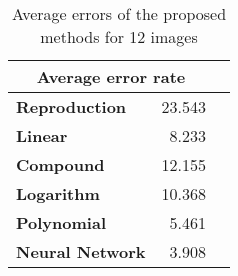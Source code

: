 \begin{table}[H]
  \begin{center}
  \resizebox{5cm}{!} {
    \begin{tabular}{l r r}
    \multicolumn{2}{c}{\textbf{Average error rate}} \\ \hline 
        \textbf{Reproduction} & 23.543\\ 
        \textbf{Linear} & 8.233\\ 
        \textbf{Compound} & 12.155\\ 
        \textbf{Logarithm} & 10.368\\ 
        \textbf{Polynomial} & 5.461\\ 
        \textbf{Neural Network} & 3.908\\ 
    \end{tabular}
  }
  \caption{Average errors of the proposed methods for 12 images }
  \end{center}
\end{table}
